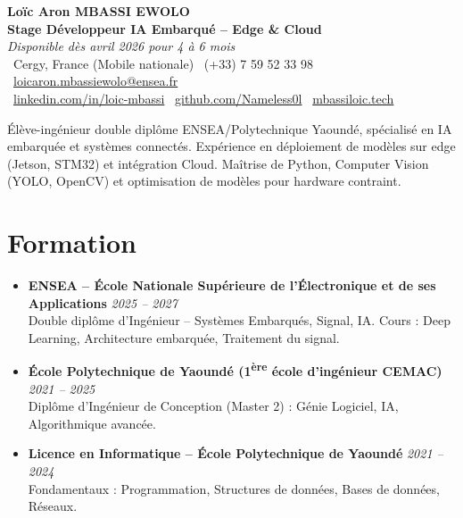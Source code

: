\documentclass[a4paper,11pt]{article}
\begin{document}
\begin{center}
    {\Large \textbf{Loïc Aron MBASSI EWOLO}} \\ \vspace{4pt}
    \textbf{\large Stage Développeur IA Embarqué -- Edge \& Cloud} \\
    \textit{\small Disponible dès avril 2026 pour 4 à 6 mois} \\ \vspace{4pt}
    \small
    \faMapMarker\ Cergy, France (Mobile nationale) \quad
    \faPhone\ (+33) 7 59 52 33 98 \quad
    \faEnvelope\ \href{mailto:loicaron.mbassiewolo@ensea.fr}{loicaron.mbassiewolo@ensea.fr} \\ \vspace{2pt}
    \faLinkedin\ \href{https://www.linkedin.com/in/loic-mbassi/}{linkedin.com/in/loic-mbassi} \quad
    \faGithub\ \href{https://github.com/Nameless0l}{github.com/Nameless0l} \quad
    \faGlobe\ \href{https://mbassiloic.tech}{mbassiloic.tech}
\end{center}

\vspace{-6pt}

\noindent\small{Élève-ingénieur double diplôme ENSEA/Polytechnique Yaoundé, spécialisé en IA embarquée et systèmes connectés. Expérience en déploiement de modèles sur edge (Jetson, STM32) et intégration Cloud. Maîtrise de Python, Computer Vision (YOLO, OpenCV) et optimisation de modèles pour hardware contraint.}

\section{Formation}
\begin{itemize}[leftmargin=*, label=\tiny$\bullet$, nosep]
    \item \textbf{ENSEA -- École Nationale Supérieure de l'Électronique et de ses Applications} \hfill \textit{2025 -- 2027} \\
    \small{Double diplôme d'Ingénieur -- Systèmes Embarqués, Signal, IA. Cours : Deep Learning, Architecture embarquée, Traitement du signal.}
    \item \textbf{École Polytechnique de Yaoundé (1\textsuperscript{ère} école d'ingénieur CEMAC)} \hfill \textit{2021 -- 2025} \\
    \small{Diplôme d'Ingénieur de Conception (Master 2) : Génie Logiciel, IA, Algorithmique avancée.}
    \item \textbf{Licence en Informatique -- École Polytechnique de Yaoundé} \hfill \textit{2021 -- 2024} \\
    \small{Fondamentaux : Programmation, Structures de données, Bases de données, Réseaux.}
\end{itemize}
\end{document}
